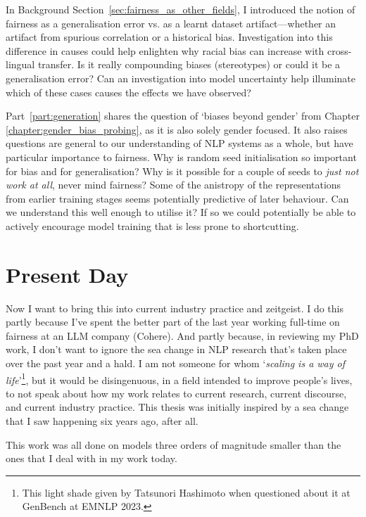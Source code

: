In Background Section~\ref{sec:fairness_as_other_fields}, I introduced the notion of fairness as a generalisation error vs. as a learnt dataset artifact---whether an artifact from spurious correlation or a historical bias. Investigation into this difference in causes could help enlighten why racial bias can increase with cross-lingual transfer. Is it really compounding biases (stereotypes) or could it be a generalisation error? %
Can an investigation into model uncertainty help illuminate which of these cases causes the effects we have observed?

Part~\ref{part:generation} shares the question of `biases beyond gender' from Chapter \ref{chapter:gender_bias_probing}, as it is also solely gender focused. It also raises questions are general to our understanding of NLP systems as a whole, but have particular importance to fairness. Why is random seed initialisation so important for bias and for generalisation? Why is it possible for a couple of seeds to \textit{just not work at all}, never mind fairness? Some of the anistropy of the representations from earlier training stages seems potentially predictive of later behaviour. Can we understand this well enough to utilise it? If so we could potentially be able to actively encourage model training that is less prone to shortcutting. 

\section{Present Day}
Now I want to bring this into current industry practice and zeitgeist. I do this partly because I've spent the better part of the last year working full-time on fairness at an LLM company (Cohere). And partly because, in reviewing my PhD work, I don't want to ignore the sea change in NLP research that's taken place over the past year and a hald. I am not someone for whom `\textit{scaling is a way of life}'\footnote{This light shade given by Tatsunori Hashimoto when questioned about it at GenBench at EMNLP 2023.}, but it would be disingenuous, in a field intended to improve people's lives, to not speak about how my work relates to current research, current discourse, and current industry practice. This thesis was initially inspired by a sea change that I saw happening six years ago, after all. 

This work was all done on models three orders of magnitude smaller than the ones that I deal with in my work today. 

